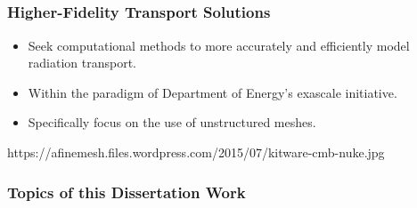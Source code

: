 \documentclass[compress,10pt]{beamer}
\begin{document}
\subsection{}
\begin{frame}[t]\frametitle{Higher-Fidelity Transport Solutions}
\centering
\begin{block}{}
\begin{itemize}
\item <1-> Seek computational methods to more accurately and efficiently model radiation transport.
\item <2-> Within the paradigm of Department of Energy's exascale initiative.
\item <3-> Specifically focus on the use of unstructured meshes.
\end{itemize}
\end{block}
{
\centering
\vspace{5mm}
}
{
\centering
\vspace{2mm}
}
{
\centering
\begin{block}{}{\footnotesize
https://afinemesh.files.wordpress.com/2015/07/kitware-cmb-nuke.jpg
}\end{block}
}
\end{frame}
\begin{frame}[t]\frametitle{Topics of this Dissertation Work}

\end{frame}
\end{document}
